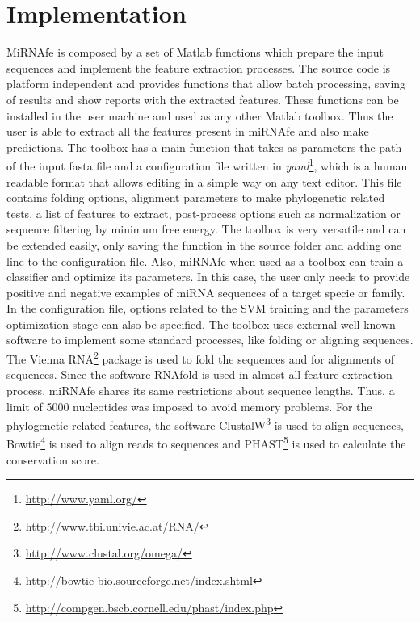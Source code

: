 \documentclass{article}
\begin{document}
\section{Implementation}
MiRNAfe is composed by a set of Matlab functions which prepare the input sequences and implement the feature extraction processes. The source code is platform
independent and provides functions that allow batch processing, saving of results and show reports with the extracted features. These functions can be
installed in the user machine and used as any other Matlab toolbox. Thus the user is able to extract all the features present in miRNAfe and also make
predictions. The toolbox has a main function that takes as parameters the path of the input fasta file and a configuration file written in
\textit{yaml}\footnote{\url{http://www.yaml.org/}}, which is a human readable format that allows editing in a simple way on any text editor. This file contains
folding options, alignment parameters to make phylogenetic related tests, a list of features to extract, post-process options such as normalization or sequence
filtering by minimum free energy. The toolbox is very versatile and can be extended easily, only saving the function in the source folder and adding one line
to the configuration file. Also, miRNAfe when used as a toolbox  can train a classifier and optimize its parameters. In this case, the user only needs to
provide positive and negative examples of miRNA sequences of a target specie or family. In the configuration file, options related to the SVM training and the
parameters optimization stage can also be specified.
The toolbox uses external well-known software to implement some standard processes, like folding or aligning sequences. The Vienna
RNA\footnote{\url{http://www.tbi.univie.ac.at/RNA/}} package is used to fold the sequences and for alignments of sequences. Since the software RNAfold is used
in almost all feature extraction process, miRNAfe shares its same restrictions about sequence lengths. Thus, a limit of 5000 nucleotides was imposed to avoid
memory problems. For the phylogenetic related features, the software ClustalW\footnote{\url{http://www.clustal.org/omega/}} is used to align sequences,
Bowtie\footnote{\url{http://bowtie-bio.sourceforge.net/index.shtml}} is used to align reads to sequences and
PHAST\footnote{\url{http://compgen.bscb.cornell.edu/phast/index.php}} is used to calculate the conservation score.
\end{document}
